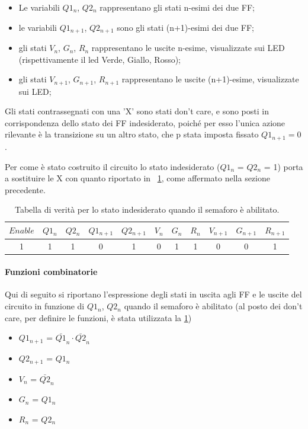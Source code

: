 \documentclass[a4paper,10pt]{article}
\begin{document}
\begin{itemize}
	\item Le variabili $Q1_n$, $Q2_n$ rappresentano gli stati n-esimi dei due FF;
	\item le variabili $Q1_{n+1}$, $Q2_{n+1}$ sono gli stati (n+1)-esimi dei due FF;
	\item gli stati $V_n$, $G_n$, $R_n$ rappresentano le uscite n-esime, visualizzate sui LED (rispettivamente il led Verde, Giallo, Rosso);
	\item gli stati $V_{n+1}$, $G_{n+1}$, $R_{n+1}$ rappresentano le uscite (n+1)-esime, visualizzate sui LED;
\end{itemize}
Gli stati contrassegnati con una 'X' sono stati don't care, e sono posti in corrispondenza dello stato dei FF indesiderato, poiché per esso l'unica azione rilevante è la transizione su un altro stato, che p stata imposta fissato $ Q1_{n+1} = 0 $.

Per come è stato costruito il circuito lo stato indesiderato ($Q1_n$ = $Q2_n$ = 1) porta a sostituire le X con quanto riportato in \tablename{~\ref{tab:inde}}, come affermato nella sezione precedente.

\begin{table}[H]
	\centering
	\begin{tabular}{c|cc|cc|ccc|ccc}
		\hline
		$Enable$ & $Q1_n$ &	$Q2_n$ & $Q1_{n+1}$ & $Q2_{n+1}$ & $V_n$ & $G_n$ & $R_n$ & $V_{n+1}$ & $G_{n+1}$ & $R_{n+1}$ \\
		\hline
		1 & 1 & 1 & 0 & 1 & 0 &  1 & 1 & 0 & 0 & 1  \\
		\hline
	\end{tabular}
	\caption{Tabella di verità per lo stato indesiderato quando il semaforo è abilitato.}
	\label{tab:inde}
\end{table}
%

\paragraph{Funzioni combinatorie}
Qui di seguito si riportano l'espressione degli stati in uscita agli FF e le uscite del circuito in funzione di $Q1_n$, $Q2_n$ quando il semaforo è abilitato (al posto dei don't care, per definire le funzioni, è stata utilizzata la \cref{tab:inde})
\begin{itemize}
\item $Q1_{n+1}$ = $\bar{Q1}_n \cdot \bar{Q2}_n $
\item $Q2_{n+1}$ = $Q1_n$ 
\item $V_{n}$ = $\bar{Q2}_n$
\item $G_{n}$ = $Q1_n$ 
\item $R_{n}$ = $Q2_n$ 
\end{itemize}
\end{document}
